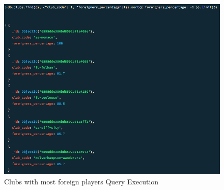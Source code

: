 \documentclass{Configuration_Files/PoliMi3i_thesis}
\begin{document}
\begin{figure}[htbp]
    \centering
    \includegraphics[scale=1]{Images/Queries/Clubs/Foreign_percentages/fp.png}
    \caption{Clubs with most foreign players Query Execution}
\end{figure}
\newpage
\end{document}

